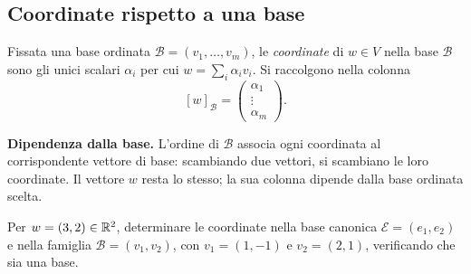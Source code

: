 \subsection{Coordinate rispetto a una base}

\begin{definizione}
Fissata una base ordinata $\mathcal B=(v_1,\ldots,v_m)$, le \emph{coordinate} di $w\in V$ nella base $\mathcal B$ sono gli unici scalari $\alpha_i$ per cui $w=\sum_i\alpha_iv_i$. Si raccolgono nella colonna
\[
  [w]_{\mathcal B}=\begin{pmatrix}\alpha_1\\\vdots\\\alpha_m\end{pmatrix}.
\]
\end{definizione}

\textbf{Dipendenza dalla base.} L'ordine di $\mathcal B$ associa ogni coordinata al corrispondente vettore di base: scambiando due vettori, si scambiano le loro coordinate. Il vettore $w$ resta lo stesso; la sua colonna dipende dalla base ordinata scelta.

\begin{esercizio}
Per $w=(3,2)\in\mathbb{R}^2$, determinare le coordinate nella base canonica $\mathcal E=(e_1,e_2)$ e nella famiglia $\mathcal B=(v_1,v_2)$, con $v_1=(1,-1)$ e $v_2=(2,1)$, verificando che sia una base.
\end{esercizio}

